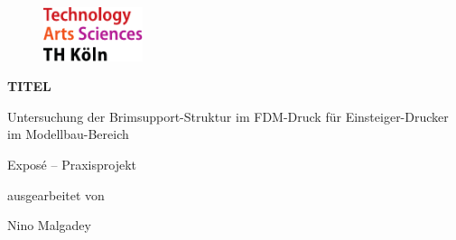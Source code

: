 \begin{titlepage}

\begin{center}

\begin{figure}[!ht]
		\includegraphics[width=0.26\textwidth]{images/THlogoheader.pdf}
\end{figure}

\vspace{0.4cm}

\begin{rmfamily}
\begin{huge}
\textbf{TITEL}\\	
\end{huge}
\begin{LARGE}
	Untersuchung der Brimsupport-Struktur im FDM-Druck für Einsteiger-Drucker im Modellbau-Bereich\\
\end{LARGE}
\vspace{0.5cm}
\end{rmfamily}

\vspace{0.8cm}



\begin{LARGE}
\begin{scshape}
Exposé – Praxisprojekt\\[0.8em]
\end{scshape}
\end{LARGE}

\begin{large}
ausgearbeitet von\\ 
\vspace{0.3cm}
\begin{LARGE}
Nino Malgadey\\
\end{LARGE}
\end{large}


\end{center}
\end{titlepage}
